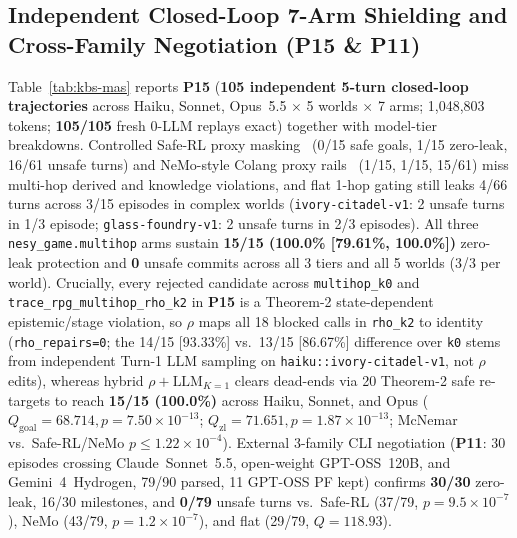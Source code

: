 \subsection{Independent Closed-Loop 7-Arm Shielding and Cross-Family Negotiation (\textbf{P15} \& \textbf{P11})}\label{sec:kbs-mas}
Table~\ref{tab:kbs-mas} reports \textbf{P15} (\textbf{105 independent 5-turn closed-loop trajectories} across Haiku, Sonnet, Opus~5.5 $\times$ 5 worlds $\times$ 7 arms; 1,048,803 tokens; \textbf{105/105} fresh 0-LLM replays exact) together with model-tier breakdowns. Controlled Safe-RL proxy masking~\cite{alshiekh2018shield} (0/15 safe goals, 1/15 zero-leak, 16/61 unsafe turns) and NeMo-style Colang proxy rails~\cite{rebedea2023nemo} (1/15, 1/15, 15/61) miss multi-hop derived and knowledge violations, and flat 1-hop gating still leaks 4/66 turns across 3/15 episodes in complex worlds (\texttt{ivory-citadel-v1}: 2 unsafe turns in 1/3 episode; \texttt{glass-foundry-v1}: 2 unsafe turns in 2/3 episodes). All three \texttt{nesy\_game.multihop} arms sustain \textbf{15/15 (100.0\% [79.61\%, 100.0\%])} zero-leak protection and \textbf{0} unsafe commits across all 3 tiers and all 5 worlds (3/3 per world). Crucially, every rejected candidate across \texttt{multihop\_k0} and \texttt{trace\_rpg\_multihop\_rho\_k2} in \textbf{P15} is a Theorem-2 state-dependent epistemic/stage violation, so $\rho$ maps all 18 blocked calls in \texttt{rho\_k2} to identity (\texttt{rho\_repairs=0}; the 14/15 [93.33\%] vs.\ 13/15 [86.67\%] difference over \texttt{k0} stems from independent Turn-1 LLM sampling on \texttt{haiku::ivory-citadel-v1}, not $\rho$ edits), whereas hybrid $\rho{+}\text{LLM}_{K=1}$ clears dead-ends via 20 Theorem-2 safe re-targets to reach \textbf{15/15 (100.0\%)} across Haiku, Sonnet, and Opus ($Q_{\mathrm{goal}}{=}68.714, p{=}7.50{\times}10^{-13}$; $Q_{\mathrm{zl}}{=}71.651, p{=}1.87{\times}10^{-13}$; McNemar vs.\ Safe-RL/NeMo $p{\le}1.22{\times}10^{-4}$). External 3-family CLI negotiation (\textbf{P11}: 30 episodes crossing Claude~Sonnet~5.5, open-weight GPT-OSS~120B, and Gemini~4~Hydrogen, 79/90 parsed, 11 GPT-OSS PF kept) confirms \textbf{30/30} zero-leak, 16/30 milestones, and \textbf{0/79} unsafe turns vs.\ Safe-RL (37/79, $p{=}9.5{\times}10^{-7}$), NeMo (43/79, $p{=}1.2{\times}10^{-7}$), and flat (29/79, $Q{=}118.93$).

